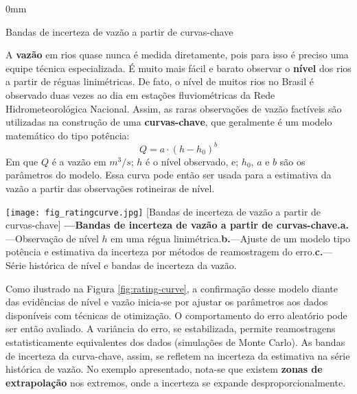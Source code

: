 \documentclass[./main.tex]{subfiles}
\begin{document}
\begin{adjustwidth}{\bodytab}{0mm}
\begin{simplebox}[
    width=140mm,
    float=t,
    label={destaque_curvas_chave},
    nameref={Curvas-chave}
    ]{Bandas de incerteza de vazão a partir de curvas-chave}
    \footnotesize
    \begin{minipage}[t]{\linewidth}    
    \par A \textbf{vazão} em rios quase nunca é medida diretamente, pois para isso é preciso uma equipe técnica especializada. É muito mais fácil e barato observar o \textbf{nível} dos rios a partir de réguas linimétricas. De fato, o nível de muitos rios no Brasil é observado duas vezes ao dia em estações fluviométricas da Rede Hidrometeorológica Nacional. Assim, as raras observações de vazão factíveis são utilizadas na construção de uma \textbf{curvas-chave}, que geralmente é um modelo matemático do tipo potência:
    \begin{equation*} %
    		\label{eq:rating_curve}
    		Q = a \cdot (h - h_0)^b
    \end{equation*}
    Em que $Q$ é a vazão em $m^{3}/s$; $h$ é o nível observado, e; $h_0$, $a$ e $b$ são os parâmetros do modelo. Essa curva pode então ser usada para a estimativa da vazão a partir das observações rotineiras de nível. 
    \end{minipage}
    \begin{minipage}[t]{\linewidth}
        \begin{minipage}[t]{\linewidth}
        \vspace*{5pt}
        	\texttt{[image: fig\_ratingcurve.jpg]}		
        	[Bandas de incerteza de vazão a partir de curvas-chave]{
                \textbf{---\;Bandas de incerteza de vazão a partir de curvas-chave.}\;\textbf{a.}---\;Observação de nível $h$ em uma régua linimétrica.\;\textbf{b.}---\;Ajuste de um modelo tipo potência e estimativa da incerteza por métodos de reamostragem do erro.\;\textbf{c.}---\;Série histórica de nível e bandas de incerteza da vazão.
        	}
            \label{fig:rating-curve}  %
        \vspace*{5pt}
    \end{minipage}
    \end{minipage}
    \begin{minipage}[t]{\linewidth}
    \par Como ilustrado na Figura \ref{fig:rating-curve}, a confirmação desse modelo diante das evidências de nível e vazão inicia-se por ajustar os parâmetros aos dados disponíveis com técnicas de otimização. O comportamento do erro aleatório pode ser então avaliado. A variância do erro, se estabilizada, permite reamostragens estatisticamente equivalentes dos dados (simulações de Monte Carlo). As bandas de incerteza da curva-chave, assim, se refletem na incerteza da estimativa na série histórica de vazão. No exemplo apresentado, nota-se que existem \textbf{zonas de extrapolação} nos extremos, onde a incerteza se expande desproporcionalmente.    
    \end{minipage}
\label{box:rating-curve}
\normalsize
\end{simplebox}


\end{adjustwidth}
\end{document}
